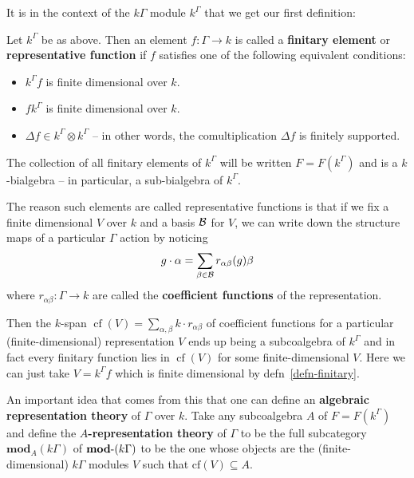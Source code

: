 \documentclass[12pt]{article}
\DeclareMathOperator{\1}{\mathbbm{1}}
\begin{document}
It is in the context of the $k\Gamma$ module $k^\Gamma$ that we get our first definition:
\begin{defn}\label{defn-finitary}
	Let $k^\Gamma$ be as above. Then an element $f:\Gamma\to k$ is called a \textbf{finitary element} or \textbf{representative function}
	if $f$ satisfies one of the following equivalent conditions:
	\begin{itemize}
		\item $k^\Gamma f$ is finite dimensional over $k$.
		\item $f k^\Gamma$ is finite dimensional over $k$.
		\item $\Delta f\in k^\Gamma\otimes k^\Gamma$ -- in other words, the comultiplication $\Delta f$ is finitely supported.
	\end{itemize}
\end{defn}
\begin{rmk}
	The collection of all finitary elements of $k^\Gamma$ will be written $F=F(k^\Gamma)$ and is a $k$-bialgebra -- in particular,
	a sub-bialgebra of $k^\Gamma$.
\end{rmk}
\begin{rmk}
	The reason such elements are called representative functions is that if we fix a finite dimensional $V$ over $k$ 
	and a basis $\mathcal{B}$ for $V$, we can write down the structure maps of a particular $\Gamma$ action by noticing 
	\[g\cdot \alpha=\sum_{\beta\in\mathcal{B}}r_{\alpha\beta}(g)\beta\]
	where $r_{\alpha\beta}:\Gamma\to k$ are called the \textbf{coefficient functions} of the representation.

	Then the $k$-span $\operatorname{cf}(V)=\sum_{\alpha,\beta}k\cdot r_{\alpha\beta}$ of coefficient functions for a particular (finite-dimensional) representation 
	$V$ ends up being a subcoalgebra of $k^\Gamma$ and in fact every finitary function lies in $\operatorname{cf}(V)$ for some 
	finite-dimensional $V$. Here we can just take $V=k^\Gamma f$ which is finite dimensional by defn~\ref{defn-finitary}.
\end{rmk}

An important idea that comes from this that one can define an \textbf{algebraic representation theory} of $\Gamma$ over $k$. Take any subcoalgebra $A$ of $F=F(k^\Gamma)$
and define the $A$\textbf{-representation theory} of $\Gamma$ to be the full subcategory $\mathbf{mod}_A(k\Gamma)$ of $\mathbf{mod}\text{-}(k\Gamma)$ to be the one whose 
objects are the (finite-dimensional) $k\Gamma$ modules $V$ such that $\text{cf}(V)\subseteq A$.
\end{document}
